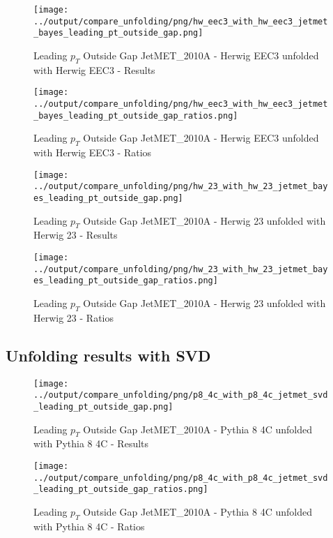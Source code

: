 \documentclass[11pt]{book}
\begin{document}
\begin{figure}[ht]
\centering
\texttt{[image: ../output/compare\_unfolding/png/hw\_eec3\_with\_hw\_eec3\_jetmet\_bayes\_leading\_pt\_outside\_gap.png]}
\caption{Leading $p_{T}$ Outside Gap JetMET\_2010A - Herwig EEC3 unfolded with Herwig EEC3 - Results}
\label{hw_eec3_hw_eec3_jetmet_bayes_leading_pt_outside_gap_a}
\end{figure}

\begin{figure}[ht]
\centering
\texttt{[image: ../output/compare\_unfolding/png/hw\_eec3\_with\_hw\_eec3\_jetmet\_bayes\_leading\_pt\_outside\_gap\_ratios.png]}
\caption{Leading $p_{T}$ Outside Gap JetMET\_2010A - Herwig EEC3 unfolded with Herwig EEC3 - Ratios}
\label{hw_eec3_hw_eec3_jetmet_bayes_leading_pt_outside_gap_b}
\end{figure}

\begin{figure}[ht]
\centering
\texttt{[image: ../output/compare\_unfolding/png/hw\_23\_with\_hw\_23\_jetmet\_bayes\_leading\_pt\_outside\_gap.png]}
\caption{Leading $p_{T}$ Outside Gap JetMET\_2010A - Herwig 23 unfolded with Herwig 23 - Results}
\label{hw_23_hw_23_jetmet_bayes_leading_pt_outside_gap_a}
\end{figure}

\begin{figure}[ht]
\centering
\texttt{[image: ../output/compare\_unfolding/png/hw\_23\_with\_hw\_23\_jetmet\_bayes\_leading\_pt\_outside\_gap\_ratios.png]}
\caption{Leading $p_{T}$ Outside Gap JetMET\_2010A - Herwig 23 unfolded with Herwig 23 - Ratios}
\label{hw_23_hw_23_jetmet_bayes_leading_pt_outside_gap_b}
\end{figure}


\clearpage
\subsection{Unfolding results with SVD}

\begin{figure}[ht]
\centering
\texttt{[image: ../output/compare\_unfolding/png/p8\_4c\_with\_p8\_4c\_jetmet\_svd\_leading\_pt\_outside\_gap.png]}
\caption{Leading $p_{T}$ Outside Gap JetMET\_2010A - Pythia 8 4C unfolded with Pythia 8 4C - Results}
\label{p8_p8_jetmet_svd_leading_pt_outside_gap_a}
\end{figure}

\begin{figure}[ht]
\centering
\texttt{[image: ../output/compare\_unfolding/png/p8\_4c\_with\_p8\_4c\_jetmet\_svd\_leading\_pt\_outside\_gap\_ratios.png]}
\caption{Leading $p_{T}$ Outside Gap JetMET\_2010A - Pythia 8 4C unfolded with Pythia 8 4C - Ratios}
\label{p8_p8_jetmet_svd_leading_pt_outside_gap_b}
\end{figure}
\end{document}
